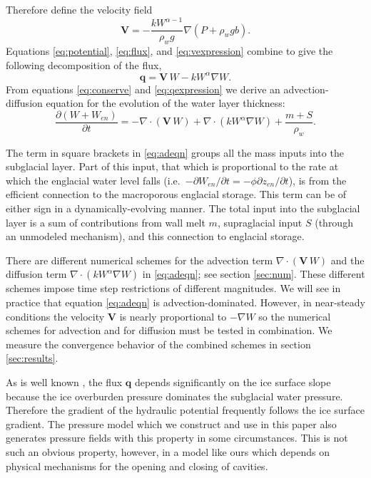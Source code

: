 \documentclass[11pt,final]{amsart}
\newcommand\bV{\mathbf{V}}
\newcommand\bq{\mathbf{q}}
\newcommand{\Div}{\nabla\cdot}
\newcommand{\grad}{\nabla}
\begin{document}
Therefore define the velocity field
\begin{equation} \label{eq:vexpression}
  \bV = - \frac{k W^{\alpha-1}}{\rho_w g} \grad \left(P + \rho_w g b\right).
\end{equation}
Equations \eqref{eq:potential}, \eqref{eq:flux}, and \eqref{eq:vexpression} combine to give the following decomposition of the flux,
\begin{equation} \label{eq:qexpression}
  \bq = \bV\, W - k W^\alpha \grad W.
\end{equation}
From equations \eqref{eq:conserve} and \eqref{eq:qexpression} we derive an advection-diffusion equation \citep{HundsdorferVerwer2010} for the evolution of the water layer thickness:
\begin{equation} \label{eq:adeqn}
  \frac{\partial (W+W_{en})}{\partial t} = - \Div\left(\bV\, W\right) + \Div \left(k W^\alpha \grad W\right) + \frac{m+S}{\rho_w}.
\end{equation}

The term in square brackets in \eqref{eq:adeqn} groups all the mass inputs into the subglacial layer.  Part of this input, that which is proportional to the rate at which the englacial water level falls (i.e.~$-\partial W_{en}/\partial t = - \phi \partial z_{en}/\partial t$), is from the efficient connection to the macroporous englacial storage.  This term can be of either sign in a dynamically-evolving manner.  The total input into the subglacial layer is a sum of contributions from wall melt $m$, supraglacial input $S$ (through an unmodeled mechanism), and this connection to englacial storage.

There are different numerical schemes for the advection term $\Div\left(\bV\, W\right)$ and the diffusion term $\Div \left(k W^\alpha \grad W\right)$ in \eqref{eq:adeqn}; see section \ref{sec:num}.  These different schemes impose time step restrictions of different magnitudes.  We will see in practice that equation \eqref{eq:adeqn} is advection-dominated.  However, in near-steady conditions the velocity $\bV$ is nearly proportional to $-\grad W$ so the numerical schemes for advection and for diffusion must be tested in combination.  We measure the convergence behavior of the combined schemes in section \ref{sec:results}.

As is well known \citep{Clarke05}, the flux $\bq$ depends significantly on the ice surface slope because the ice overburden pressure dominates the subglacial water pressure.  Therefore the gradient of the hydraulic potential frequently follows the ice surface gradient.  The pressure model which we construct and use in this paper also generates pressure fields with this property in some circumstances.  This is not such an obvious property, however, in a model like ours which depends on physical mechanisms for the opening and closing of cavities.
\end{document}
